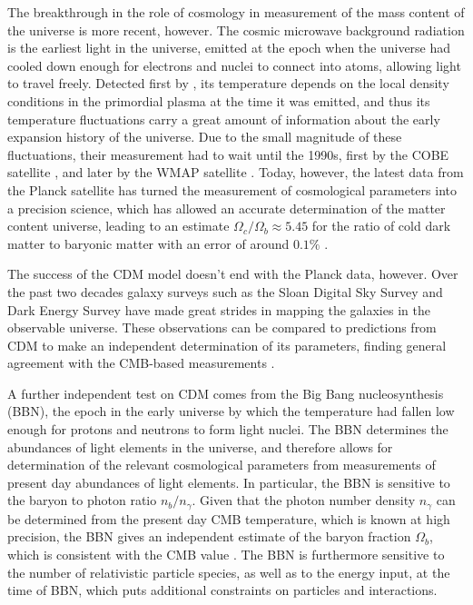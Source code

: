 \documentclass[b5paper, 10pt, twoside]{book}
\begin{document}
The breakthrough in the role of cosmology in measurement of the mass content of the universe is more recent, however. The cosmic microwave background radiation is the earliest light in the universe, emitted at the epoch when the universe had cooled down enough for electrons and nuclei to connect into atoms, allowing light to travel freely. Detected first by \textcite{PenziasWilson1965}, its temperature depends on the local density conditions in the primordial plasma at the time it was emitted, and thus its temperature fluctuations carry a great amount of information about the early expansion history of the universe. Due to the small magnitude of these fluctuations, their measurement had to wait until the 1990s, first by the COBE satellite \parencite{BennettEtAl1996}, and later by the WMAP satellite \parencite{BennettEtAl2013}. Today, however, the latest data from the Planck satellite has turned the measurement of cosmological parameters into a precision science, which has allowed an accurate determination of the matter content universe, leading to an estimate $\Omega_c/\Omega_b\approx 5.45$ for the ratio of cold dark matter to baryonic matter with an error of around $0.1\%$ \parencite{Planck2018}.

The success of the \textLambda{}CDM model doesn't end with the Planck data, however. Over the past two decades galaxy surveys such as the Sloan Digital Sky Survey \parencite{SDSSIV2022} and Dark Energy Survey \parencite{DES2018} have made great strides in mapping the galaxies in the observable universe. These observations can be compared to predictions from \textLambda{}CDM to make an independent determination of its parameters, finding general agreement with the CMB-based measurements \parencite{eBOSS2021}.

A further independent test on \textLambda{}CDM comes from the Big Bang nucleosynthesis (BBN), the epoch in the early universe by which the temperature had fallen low enough for protons and neutrons to form light nuclei. The BBN determines the abundances of light elements in the universe, and therefore allows for determination of the relevant cosmological parameters from measurements of present day abundances of light elements. In particular, the BBN is sensitive to the baryon to photon ratio $n_b/n_\gamma$. Given that the photon number density $n_\gamma$ can be determined from the present day CMB temperature, which is known at high precision, the BBN gives an independent estimate of the baryon fraction $\Omega_b$, which is consistent with the CMB value \parencite{FieldsEtAl2020}. The BBN is furthermore sensitive to the number of relativistic particle species, as well as to the energy input, at the time of BBN, which puts additional constraints on particles and interactions.
\end{document}
